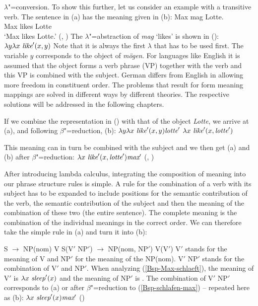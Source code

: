 $\lambda$"=conversion. To show this further, let us consider an example with a transitive verb. The sentence
in (a) has the meaning given in (b):
\eal
\ex\label{Bsp-Max-mag-Lotte} 
\gll Max mag Lotte.\\
     Max likes Lotte\\
\glt `Max likes Lotte.'
\ex {}(, )
\zl
The $\lambda$"=abstraction of \emph{mag} `likes' is shown in ():
\ea
$\lambda y \lambda x~\textit{like}'(x, y)$
\z
Note that it is always the first $\lambda$ that has to be used first. The variable $y$ corresponds
to the object of \emph{mögen}. For languages like English it is assumed that the object forms a verb
phrase (VP) together with the verb and this VP is combined with the subject. German differs from
English in allowing more freedom in constituent order. The problems that result for form meaning
mappings are solved in different ways by different theories. The respective solutions will be
addressed in the following chapters.


If we combine the representation in () with that of the object \emph{Lotte}, we arrive at (a), and following
$\beta$"=reduction, (b):
\eal
\label{lambda-moegen}
\ex $\lambda y \lambda x~\textit{like}'(x, y) \textit{lotte}'$
\ex $\lambda x~\textit{like}'(x, \textit{lotte}')$
\zl

\noindent
This meaning can in turn be combined with the subject and we then get (a) and (b) after $\beta$"=reduction:
\eal
\ex $\lambda x~\textit{like}'(x, \textit{lotte}') \textit{max}'$
\ex {}(, )
\zl

\begin{sloppypar}
\noindent
After introducing lambda calculus, integrating the composition of meaning into our phrase structure rules is simple. A rule for the
combination of a verb with its subject has to be expanded to include positions for the semantic contribution of the verb, the semantic
contribution of the subject and then the meaning of the combination of these two (the entire sentence). The complete meaning is the
combination of the individual meanings in the correct order. We can therefore take the simple rule in (a) and turn it into 
(b):
\end{sloppypar}
\eal
\ex S $\to$ NP(nom) V
\ex S(V$'$ NP$'$) $\to$ NP(nom, NP$'$) V(V$'$)
\zl
V$'$ stands for the meaning of V and NP$'$ for the meaning of the NP(nom). V$'$ NP$'$ stands for the combination of V$'$ and NP$'$. When analyzing
(\ref{Bsp-Max-schlaeft}), the meaning of V$'$ is $\lambda x~\textit{sleep}'(x)$ and the meaning of NP$'$ is . The combination of V$'$ NP$'$
corresponds to (a) or after $\beta$"=reduction to (\ref{Bsp-schlafen-max}) -- repeated here as (b):
\eal
\ex $\lambda x~\textit{sleep}'(x) \textit{max}'$
\ex {}()
\zl

